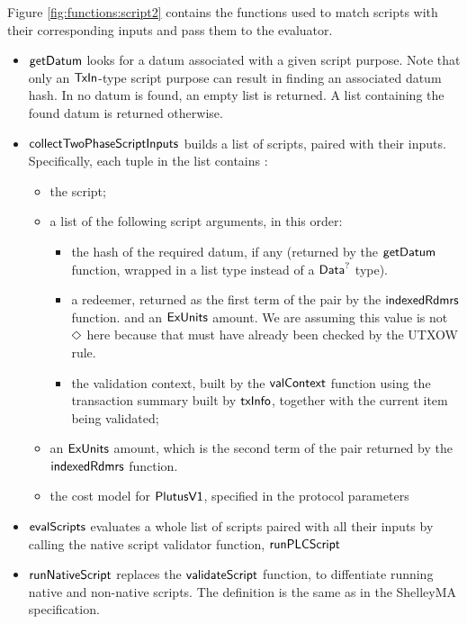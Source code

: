Figure \ref{fig:functions:script2} contains the functions used to
match scripts with their corresponding inputs and pass them to the
evaluator.

\begin{itemize}
  \item $\mathsf{getDatum}$ looks for a datum associated with a given script purpose. Note that
  only an $\mathsf{TxIn}$-type script purpose can result in finding an associated datum hash.
  In no datum is found, an empty list is returned. A list containing the found datum
  is returned otherwise.

  \item $\mathsf{collectTwoPhaseScriptInputs}$ builds a list of scripts, paired with their
  inputs. Specifically, each tuple in the list contains :

  \begin{itemize}
  \item the script;

  \item a list of the following script arguments, in this order:

  \begin{itemize}
    \item the hash of the required datum, if any (returned by the $\mathsf{getDatum}$ function,
    wrapped in a list type instead of a $\mathsf{Data}^?$ type).

    \item a redeemer, returned as the first term of the pair by the $\mathsf{indexedRdmrs}$ function.
    and an $\mathsf{ExUnits}$ amount. We are assuming this value is not $\Diamond$ here
    because that must have already been checked by the UTXOW rule.

    \item the validation context, built by the $\mathsf{valContext}$ function using
    the transaction summary built by $\mathsf{txInfo}$, together with the current item being validated;
  \end{itemize}

  \item an $\mathsf{ExUnits}$ amount, which is the second term of the pair returned by the $\mathsf{indexedRdmrs}$ function.

  \item the cost model for $\mathsf{PlutusV1}$, specified in the protocol parameters
  \end{itemize}

  \item $\mathsf{evalScripts}$ evaluates a whole list of scripts paired with all their
  inputs by calling the native script validator function, $\mathsf{runPLCScript}$

  \item $\mathsf{runNativeScript}$ replaces the $\mathsf{validateScript}$ function,
  to diffentiate running native and non-native scripts. The definition is the
  same as in the ShelleyMA specification.
\end{itemize}

